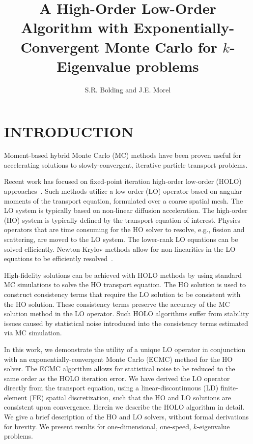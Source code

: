 \documentclass[10pt,twocolumn,pdftex,superscriptaddress]{anstrans}
\title{\boldmath A High-Order Low-Order Algorithm with
Exponentially-Convergent Monte Carlo for $k$-Eigenvalue problems}
\author{S.R. Bolding\inst{1} and J.E. Morel\inst{2}}
\institute{
    \inst{1}\textit{Texas A\&M University Nuclear Engineering Department,
    \href{mailto:sbolding@tamu.edu}{sbolding@tamu.edu}} \\
    \inst{2}\textit{Texas A\&M University Nuclear Engineering Department,
    \href{mailto:morel@tamu.edu}{morel@tamu.edu}}}
\begin{document}
\twocolumn[
\maketitle
\vspace{-0.204in}]
\pagestyle{empty}
\thispagestyle{empty}

\section*{INTRODUCTION}

Moment-based hybrid Monte Carlo (MC) methods have been proven useful for accelerating
solutions to slowly-convergent, iterative particle transport problems.
\begin{comment}
requiring fixed-point iterations (e.g.,
eigenvalue or source iteration problmes).
\end{comment}
Recent work has focused on fixed-point iteration high-order low-order
(HOLO) approaches~\cite{willert}.   Such methods utilize a low-order (LO) operator based on angular moments of the
transport equation, formulated over a coarse spatial mesh. The LO system is typically
based on non-linear diffusion acceleration.  The high-order (HO) system is typically
defined by the transport equation of interest.  Physics operators that are time
consuming for the HO solver to resolve, e.g., fission and
scattering, are moved to the LO system.  The lower-rank LO equations can be solved
efficiently.  Newton-Krylov methods allow for non-linearities in the LO equations to
be efficiently resolved~\cite{willert}.

High-fidelity solutions can be achieved with HOLO methods by using standard
MC simulations to solve the HO transport
equation. The HO solution is used to construct consistency
terms that require the LO solution to be consistent with the HO solution.  These
consistency terms preserve
the accuracy of the MC solution method in the LO operator. Such HOLO algorithms suffer from stability issues caused by statistical noise introduced into the
consistency terms estimated via MC simulation.

In this work, we demonstrate the utility of a unique LO operator in conjunction with
an exponentially-convergent Monte
Carlo (ECMC) method\cite{jake} for the HO solver.  The ECMC algorithm
allows for statistical noise to be reduced to the same order as the HOLO iteration error. We have derived the LO operator
directly from the transport equation, using a linear-discontinuous (LD)
finite-element (FE) spatial
discretization, such that the
HO and LO solutions are consistent upon convergence.  Herein we describe the HOLO algorithm in detail.  We give a brief description of the HO and
LO solvers, without formal derivations
for brevity.  We present results for one-dimensional,
one-speed, $k$-eigenvalue problems. 
\end{document}
